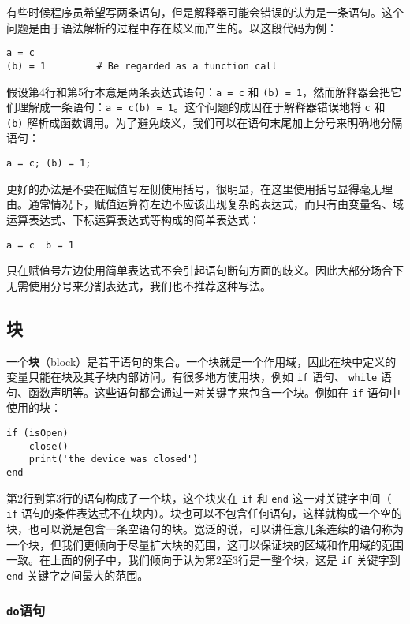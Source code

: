 有些时候程序员希望写两条语句，但是解释器可能会错误的认为是一条语句。这个问题是由于语法解析的过程中存在歧义而产生的。以这段代码为例：
\begin{lstlisting}[language=berry, numbers=none]
a = c
(b) = 1         # Be regarded as a function call
\end{lstlisting}
假设第4行和第5行本意是两条表达式语句：\texttt{a = c} 和 \texttt{(b) = 1}，然而解释器会把它们理解成一条语句：\texttt{a = c(b) = 1}。这个问题的成因在于解释器错误地将 \texttt{c} 和 \texttt{(b)} 解析成函数调用。为了避免歧义，我们可以在语句末尾加上分号来明确地分隔语句：
\begin{lstlisting}[language=berry, numbers=none]
a = c; (b) = 1;
\end{lstlisting}
更好的办法是不要在赋值号左侧使用括号，很明显，在这里使用括号显得毫无理由。通常情况下，赋值运算符左边不应该出现复杂的表达式，而只有由变量名、域运算表达式、下标运算表达式等构成的简单表达式：
\begin{lstlisting}[language=berry, numbers=none]
a = c  b = 1
\end{lstlisting}
只在赋值号左边使用简单表达式不会引起语句断句方面的歧义。因此大部分场合下无需使用分号来分割表达式，我们也不推荐这种写法。

\subsection{块} \label{section::block}

一个\textbf{块}（block）是若干语句的集合。一个块就是一个作用域，因此在块中定义的变量只能在块及其子块内部访问。有很多地方使用块，例如 \texttt{if} 语句、 \texttt{while} 语句、函数声明等。这些语句都会通过一对关键字来包含一个块。例如在 \texttt{if} 语句中使用的块：
\begin{lstlisting}[language=berry]
if (isOpen)
    close()
    print('the device was closed')
end
\end{lstlisting}
第2行到第3行的语句构成了一个块，这个块夹在 \texttt{if} 和 \texttt{end} 这一对关键字中间（ \texttt{if} 语句的条件表达式不在块内）。块也可以不包含任何语句，这样就构成一个空的块，也可以说是包含一条空语句的块。宽泛的说，可以讲任意几条连续的语句称为一个块，但我们更倾向于尽量扩大块的范围，这可以保证块的区域和作用域的范围一致。在上面的例子中，我们倾向于认为第2至3行是一整个块，这是 \texttt{if} 关键字到 \texttt{end} 关键字之间最大的范围。

\subsubsection{\texttt{do}语句}

